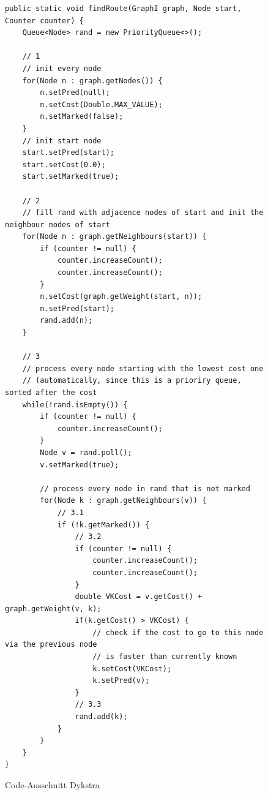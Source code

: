 \documentclass[11pt]{scrartcl}
\begin{document}
\begin{figure}

\begin{small}
\begin{verbatim}
public static void findRoute(GraphI graph, Node start, Counter counter) {
    Queue<Node> rand = new PriorityQueue<>();

    // 1
    // init every node
    for(Node n : graph.getNodes()) {
        n.setPred(null);
        n.setCost(Double.MAX_VALUE);
        n.setMarked(false);
    }
    // init start node
    start.setPred(start);
    start.setCost(0.0);
    start.setMarked(true);

    // 2
    // fill rand with adjacence nodes of start and init the neighbour nodes of start
    for(Node n : graph.getNeighbours(start)) {
        if (counter != null) {
            counter.increaseCount();
            counter.increaseCount();
        }
        n.setCost(graph.getWeight(start, n));
        n.setPred(start);
        rand.add(n);
    }

    // 3
    // process every node starting with the lowest cost one 
    // (automatically, since this is a prioriry queue, sorted after the cost
    while(!rand.isEmpty()) {
        if (counter != null) {
            counter.increaseCount();
        }
        Node v = rand.poll();
        v.setMarked(true);

        // process every node in rand that is not marked
        for(Node k : graph.getNeighbours(v)) {
            // 3.1
            if (!k.getMarked()) {
                // 3.2
                if (counter != null) {
                    counter.increaseCount();
                    counter.increaseCount();
                }
                double VKCost = v.getCost() + graph.getWeight(v, k);
                if(k.getCost() > VKCost) { 
                    // check if the cost to go to this node via the previous node
                    // is faster than currently known
                    k.setCost(VKCost);
                    k.setPred(v);
                }
                // 3.3
                rand.add(k);
            }
        }
    }
}
\end{verbatim}
\end{small}
\caption{Code-Ausschnitt Dykstra}
\label{figure:dykstra}
\end{figure}
\end{document}

